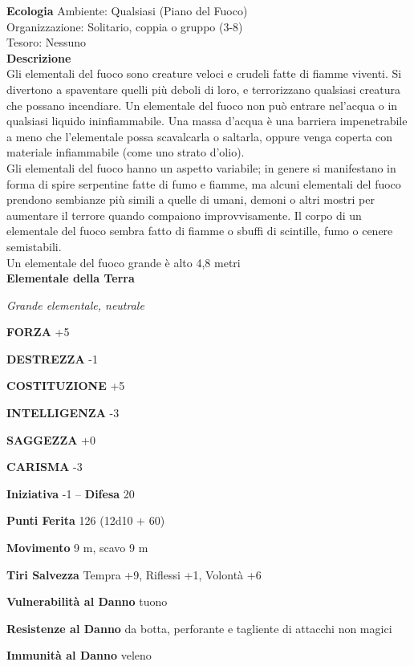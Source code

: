\begin{multicols}{2}
\textbf{Ecologia}
Ambiente: Qualsiasi (Piano del Fuoco)\\
Organizzazione: Solitario, coppia o gruppo (3-8)\\
Tesoro: Nessuno\\
\textbf{Descrizione}\\
Gli elementali del fuoco sono creature veloci e crudeli fatte di fiamme viventi. Si divertono a spaventare quelli più deboli di loro, e terrorizzano qualsiasi creatura che possano incendiare. Un elementale del fuoco non può entrare nel'acqua o in qualsiasi liquido ininfiammabile. Una massa d'acqua è una barriera impenetrabile a meno che l'elementale possa scavalcarla o saltarla, oppure venga coperta con materiale infiammabile (come uno strato d'olio).\\
Gli elementali del fuoco hanno un aspetto variabile; in genere si manifestano in forma di spire serpentine fatte di fumo e fiamme, ma alcuni elementali del fuoco prendono sembianze più simili a quelle di umani, demoni o altri mostri per aumentare il terrore quando compaiono improvvisamente. Il corpo di un elementale del fuoco sembra fatto di fiamme o sbuffi di scintille, fumo o cenere semistabili.\\

Un elementale del fuoco grande è alto 4,8 metri\\

\medskip{}\textbf{Elementale della Terra}

\emph{Grande elementale, neutrale}

\textbf{FORZA} +5

\textbf{DESTREZZA} -1

\textbf{COSTITUZIONE} +5

\textbf{INTELLIGENZA} -3

\textbf{SAGGEZZA} +0

\textbf{CARISMA} -3

\textbf{Iniziativa} -1 -- \textbf{Difesa} 20

\textbf{Punti Ferita} 126 (12d10 + 60)

\textbf{Movimento} 9 m, scavo 9 m

\textbf{Tiri Salvezza} Tempra +9, Riflessi +1, Volontà +6

\textbf{Vulnerabilità al Danno} tuono

\textbf{Resistenze al Danno} da botta, perforante e tagliente di attacchi non magici

\textbf{Immunità al Danno} veleno


\end{multicols}

